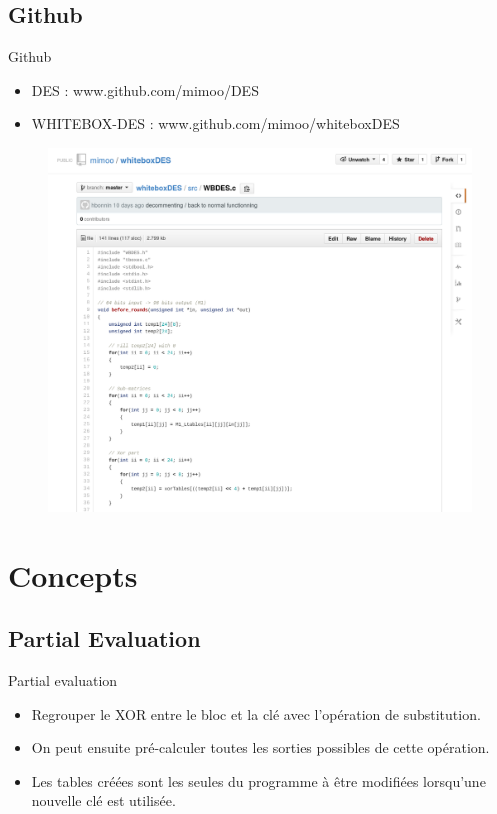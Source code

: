 \documentclass{beamer}
\begin{document}
\subsection{Github}
\begin{frame}{Github}
  \begin{itemize}
  \item DES : www.github.com/mimoo/DES
  \item WHITEBOX-DES : www.github.com/mimoo/whiteboxDES
  \end{itemize}

  \begin{figure}[h]
    \centering
    \includegraphics[scale=0.30]{./images/github.png}
  \end{figure}
\end{frame}

\section{Concepts}

\subsection{Partial Evaluation}
\begin{frame}{Partial evaluation}
\begin{itemize}
\item Regrouper le XOR entre le bloc et la clé avec l'opération de substitution.
\item On peut ensuite pré-calculer toutes les sorties possibles de cette opération.
\item Les tables créées sont les seules du programme à être modifiées lorsqu'une nouvelle clé est utilisée.
\end{itemize}
\end{frame}
\end{document}
